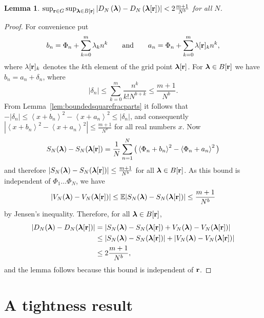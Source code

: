 \documentclass[aap]{imsart}
\newcommand{\expect}{{\mathbb E}}
\newcommand{\fracpart}[1]{\left\langle #1 \right\rangle}
\newcommand{\sabs}[1]{\vert #1 \vert}
\newtheorem{lemma}{Lemma}
\begin{document}
 \begin{lemma}\label{lem:supBVn} $\sup_{\mathbf{r}\in G}\sup_{ \boldsymbol{\lambda}  \in B[\mathbf{r}] }\left\vert D_N\left(  \boldsymbol{\lambda} \right) - D_N\left(  \boldsymbol{\lambda}[\mathbf{r}] \right)\right\vert < 2\frac{m+1}{N^b}$ for all $N$.
 \end{lemma}
 \begin{proof}
For convenience put 
\[
b_n = \Phi_n + \sum_{k = 0}^{m}{\lambda_k n^k} \qquad \text{and} \qquad  a_n = \Phi_n + \sum_{k = 0}^{m}{\lambda[\mathbf{r}]_k n^k},
\] 
where $\lambda[\mathbf{r}]_k$ denotes the $k$th element of the grid point $\boldsymbol{\lambda}[\mathbf{r}]$. For $\boldsymbol{\lambda} \in B[\mathbf{r}]$ we have $b_n = a_n + \delta_n$,
where 
\[
\sabs{\delta_n} \leq \sum_{k=0}^m\frac{n^k}{k! N^{b+k}} \leq \frac{m+1}{N^{b}}.
\] 
From Lemma~\ref{lem:boundedsquarefracparts} it follows that $-|\delta_n| \leq \fracpart{x + b_n}^2 -  \fracpart{x + a_n}^2  \leq |\delta_n|$,
and consequently $|\fracpart{x + b_n}^2 -  \fracpart{x + a_n}^2| \leq \tfrac{m+1}{N^b}$ for all real numbers $x$. Now
\[
S_N(\lambdabf) - S_N(\lambdabf[\rbf]) =  \frac{1}{N}\sum_{n=1}^{N}\big( \fracpart{\Phi_n + b_n}^2 -  \fracpart{\Phi_n + a_n}^2 \big)
\]
and therefore $\sabs{S_N(\lambdabf) - S_N(\lambdabf[\rbf])} \leq \frac{m+1}{N^b}$ for all $\boldsymbol{\lambda} \in B[\mathbf{r}]$.  As this bound is independent of $\Phi_1 \dots \Phi_N$, we have
\[
\sabs{ V_N(\lambdabf) - V_N(\lambdabf[\rbf])} \leq \expect \sabs{ S_N(\lambdabf) - S_N(\lambdabf[\rbf])} \leq \frac{m+1}{N^b}
\]
by Jensen's inequality.  Therefore, for all $\boldsymbol{\lambda} \in B[\mathbf{r}]$,
 \begin{align*}
 \sabs{ D_N(\lambdabf) - D_N(\lambdabf[\rbf]) } &= \sabs{ S_N(\lambdabf) - S_N(\lambdabf[\rbf]) + V_N(\lambdabf) - V_N(\lambdabf[\rbf]) } \\
&\leq \sabs{ S_N(\lambdabf) - S_N(\lambdabf[\rbf]) \vert + \vert V_N(\lambdabf) - V_N(\lambdabf[\rbf]) } \\
&\leq 2\frac{m+1}{N^{b}},
\end{align*}
and the lemma follows because this bound is independent of $\mathbf{r}$.
 \end{proof}


\section{A tightness result}\label{app:tightness-result}
\end{document}
